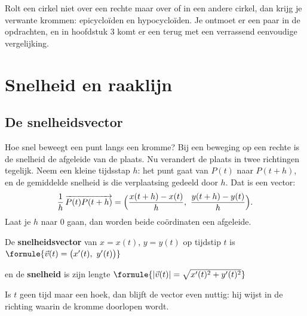 Rolt een cirkel niet over een rechte maar over of in een andere cirkel, dan krijg je verwante krommen: epicycloïden en hypocycloïden. Je ontmoet er een paar in de opdrachten, en in hoofdstuk 3 komt er een terug met een verrassend eenvoudige vergelijking.

\section{Snelheid en raaklijn}

\subsection{De snelheidsvector}

Hoe snel beweegt een punt langs een kromme? Bij een beweging op een rechte is de snelheid de afgeleide van de plaats. Nu verandert de plaats in twee richtingen tegelijk. Neem een kleine tijdsstap $h$: het punt gaat van $P(t)$ naar $P(t + h)$, en de gemiddelde snelheid is die verplaatsing gedeeld door $h$. Dat is een vector:
\[ \frac{1}{h}\,\overrightarrow{P(t)P(t+h)} = \Bigl(\frac{x(t + h) - x(t)}{h},\ \frac{y(t + h) - y(t)}{h}\Bigr) . \]
Laat je $h$ naar 0 gaan, dan worden beide coördinaten een afgeleide.

\begin{theorie}
De \textbf{\textcolor{accent}{snelheidsvector}} van $x = x(t)$, $y = y(t)$ op tijdstip $t$ is \quad $\formule{\vec v(t) = \bigl(x'(t),\ y'(t)\bigr)}$

\vspace{1mm}
en de \textbf{\textcolor{accent}{snelheid}} is zijn lengte \quad $\formule{|\vec v(t)| = \sqrt{x'(t)^2 + y'(t)^2}}$
\end{theorie}

Is $t$ geen tijd maar een hoek, dan blijft de vector even nuttig: hij wijst in de richting waarin de kromme doorlopen wordt.

